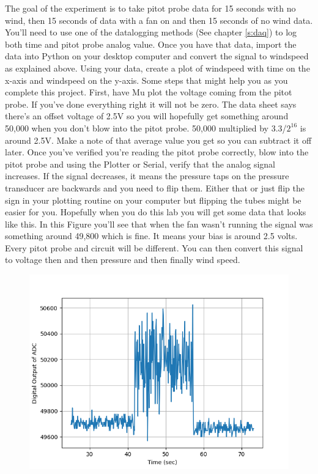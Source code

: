 The goal of the experiment is to take pitot probe data for 15 seconds with no wind, then 15 seconds of data with a fan on and then 15 seconds of no wind data. You’ll need to use one of the datalogging methods (See chapter \ref{s:daq}) to log both time and pitot probe analog value. Once you have that data, import the data into Python on your desktop computer and convert the signal to windspeed as explained above. Using your data, create a plot of windspeed with time on the x-axis and windspeed on the y-axis. Some steps that might help you as you complete this project. First, have Mu plot the voltage coming from the pitot probe. If you’ve done everything right it will not be zero. The data sheet says there’s an offset voltage of 2.5V so you will hopefully get something around 50,000 when you don’t blow into the pitot probe. 50,000 multiplied by 3.3/$2^{16}$ is around 2.5V. Make a note of that average value you get so you can subtract it off later. Once you’ve verified you’re reading the pitot probe correctly, blow into the pitot probe and using the Plotter or Serial, verify that the analog signal increases. If the signal decreases, it means the pressure taps on the pressure transducer are backwards and you need to flip them. Either that or just flip the sign in your plotting routine on your computer but flipping the tubes might be easier for you. Hopefully when you do this lab you will get some data that looks like this. In this Figure you’ll see that when the fan wasn’t running the signal was something around 49,800 which is fine. It means your bias is around 2.5 volts. Every pitot probe and circuit will be different. You can then convert this signal to voltage then and then pressure and then finally wind speed.
\begin{figure}[H]
  \begin{center}
    \includegraphics[width=\textwidth]{Figures/pitot_probe_data.png}
  \end{center}
\end{figure}
